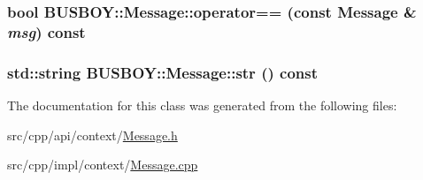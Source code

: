 \label{classBUSBOY_1_1Message_aa88bb972d6ced3dc18b1baf3818b6b2e}
\hypertarget{classBUSBOY_1_1Message_aab2b11902dcf1b0a95f5fb7b31937db9}{
\subsubsection[{operator==}]{\setlength{\rightskip}{0pt plus 5cm}bool BUSBOY::Message::operator== (const {\bf Message} \& {\em msg}) const}}
\label{classBUSBOY_1_1Message_aab2b11902dcf1b0a95f5fb7b31937db9}
\hypertarget{classBUSBOY_1_1Message_a1141a5691320a82d3b3d26e83461448d}{
\subsubsection[{str}]{\setlength{\rightskip}{0pt plus 5cm}std::string BUSBOY::Message::str () const}}
\label{classBUSBOY_1_1Message_a1141a5691320a82d3b3d26e83461448d}


The documentation for this class was generated from the following files:\begin{DoxyCompactItemize}
\item 
src/cpp/api/context/\hyperlink{Message_8h}{Message.h}\item 
src/cpp/impl/context/\hyperlink{Message_8cpp}{Message.cpp}\end{DoxyCompactItemize}
